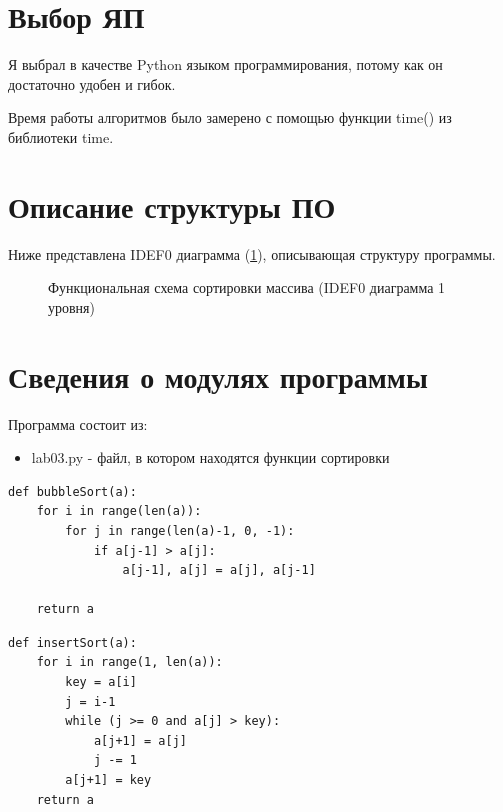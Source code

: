 \documentclass[12pt]{report}
\begin{document}
\section{Выбор ЯП}
Я выбрал в качестве Python языком программирования, потому как он достаточно удобен и гибок.

Время работы алгоритмов было замерено с помощью функции time() из библиотеки time.

\section{Описание структуры ПО}
Ниже представлена IDEF0 диаграмма (\ref{ris:imageIDEF}), описывающая структуру программы.
\begin{figure}[h]
\caption{Функциональная схема сортировки массива (IDEF0 диаграмма 1 уровня)}
\label{ris:imageIDEF}
\end{figure}

\section{Сведения о модулях программы}
Программа состоит из:
\begin{itemize}
	\item lab03.py - файл, в котором находятся функции сортировки
\end{itemize}

\begin{lstlisting}[label=some-code,caption=Сортировка пузырьком]
def bubbleSort(a):
    for i in range(len(a)):
        for j in range(len(a)-1, 0, -1):
            if a[j-1] > a[j]:
                a[j-1], a[j] = a[j], a[j-1]

    return a
\end{lstlisting}

\begin{lstlisting}[label=some-code,caption=Сортировка вставками]
def insertSort(a):
    for i in range(1, len(a)):
        key = a[i]
        j = i-1
        while (j >= 0 and a[j] > key):
            a[j+1] = a[j]
            j -= 1
        a[j+1] = key
    return a
\end{lstlisting}
\end{document}
